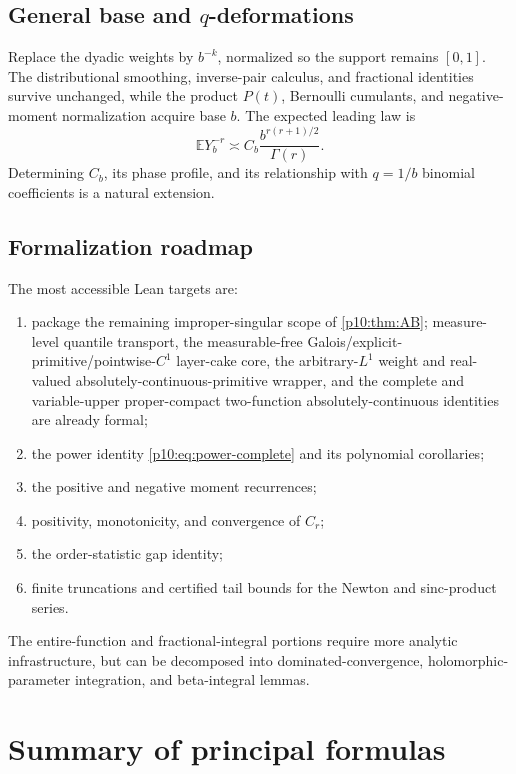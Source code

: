 \documentclass[11pt,oneside]{article}
\theoremstyle{definition}
\theoremstyle{remark}
\newcommand{\E}{\mathbb E}
\newcommand{\1}{\mathbf 1}
\begin{document}
\subsection{General base and \texorpdfstring{\(q\)}{q}-deformations}

Replace the dyadic weights by \(b^{-k}\), normalized so the support remains \([0,1]\).
The distributional smoothing, inverse-pair calculus, and fractional identities survive
unchanged, while the product \(P(t)\), Bernoulli cumulants, and negative-moment
normalization acquire base \(b\).  The expected leading law is
\begin{equation}\label{p10:eq:baseb-heuristic}
 \E Y_b^{-r}
 \asymp C_b\frac{b^{r(r+1)/2}}{\Gamma(r)}.
\end{equation}
Determining \(C_b\), its phase profile, and its relationship with \(q=1/b\) binomial
coefficients is a natural extension.

\subsection{Formalization roadmap}

The most accessible Lean targets are:
\begin{enumerate}
\item package the remaining improper-singular scope of
      \cref{p10:thm:AB}; measure-level quantile transport, the measurable-free
      Galois/explicit-primitive/pointwise-\(C^1\) layer-cake core, the arbitrary-\(L^1\)
      weight and real-valued absolutely-continuous-primitive wrapper, and the complete and
      variable-upper proper-compact two-function absolutely-continuous identities are
      already formal;
\item the power identity \cref{p10:eq:power-complete} and its polynomial corollaries;
\item the positive and negative moment recurrences;
\item positivity, monotonicity, and convergence of \(C_r\);
\item the order-statistic gap identity;
\item finite truncations and certified tail bounds for the Newton and sinc-product
series.
\end{enumerate}
The entire-function and fractional-integral portions require more analytic infrastructure,
but can be decomposed into dominated-convergence, holomorphic-parameter integration,
and beta-integral lemmas.

\section{Summary of principal formulas}
\end{document}
